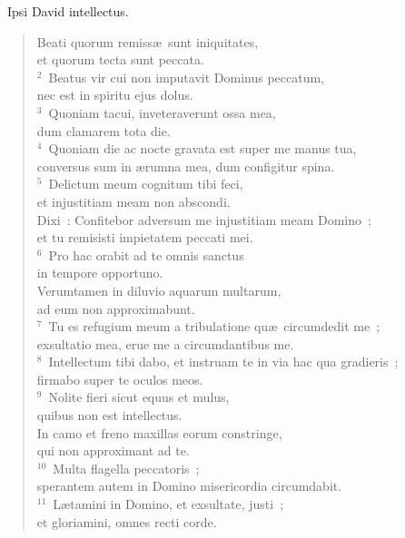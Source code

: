 ~\lettrine[lines=10,image=true,loversize=0.05,lraise=-0.03]{I}{}psi David intellectus. \begin{flushleft}\begin{verse}\vspace{6pt}Beati quorum remiss\ae\ sunt iniquitates,\\ et quorum tecta sunt peccata.\\
${}^{2}$~Beatus vir cui non imputavit Dominus peccatum,\\ nec est in spiritu ejus dolus.\\
${}^{3}$~Quoniam tacui, inveteraverunt ossa mea,\\ dum clamarem tota die.\\
${}^{4}$~Quoniam die ac nocte gravata est super me manus tua,\\ conversus sum in \ae rumna mea, dum configitur spina.\\
${}^{5}$~Delictum meum cognitum tibi feci,\\ et injustitiam meam non abscondi.\\ Dixi~: Confitebor adversum me injustitiam meam Domino~;\\ et tu remisisti impietatem peccati mei.\\
${}^{6}$~Pro hac orabit ad te omnis sanctus\\ in tempore opportuno.\\ Verumtamen in diluvio aquarum multarum,\\ ad eum non approximabunt.\\
${}^{7}$~Tu es refugium meum a tribulatione qu\ae\ circumdedit me~;\\ exsultatio mea, erue me a circumdantibus me.\\
${}^{8}$~Intellectum tibi dabo, et instruam te in via hac qua gradieris~;\\ firmabo super te oculos meos.\\
${}^{9}$~Nolite fieri sicut equus et mulus,\\ quibus non est intellectus.\\ In camo et freno maxillas eorum constringe,\\ qui non approximant ad te.\\
${}^{10}$~Multa flagella peccatoris~;\\ sperantem autem in Domino misericordia circumdabit.\\
${}^{11}$~L\ae tamini in Domino, et exsultate, justi~;\\ et gloriamini, omnes recti corde.\end{verse}\end{flushleft}


